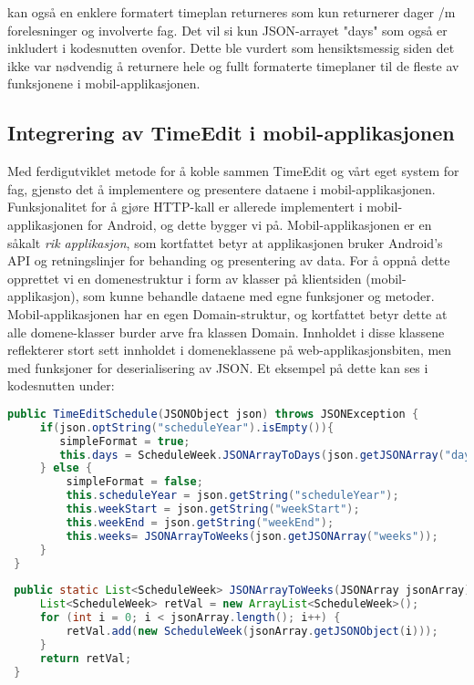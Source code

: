 \documentclass[../main.tex]{subfiles}
\begin{document}
kan også en enklere formatert timeplan returneres som kun returnerer dager /m forelesninger og involverte fag. Det vil si kun JSON-arrayet "days" som også er inkludert i kodesnutten ovenfor. Dette ble vurdert som hensiktsmessig siden det ikke var nødvendig å returnere hele og fullt formaterte timeplaner til de fleste av funksjonene i mobil-applikasjonen.

\subsection{Integrering av TimeEdit i mobil-applikasjonen}

Med ferdigutviklet metode for å koble sammen TimeEdit og vårt eget system for fag, gjensto det å implementere og presentere dataene i mobil-applikasjonen. Funksjonalitet for å gjøre HTTP-kall er allerede implementert i mobil-applikasjonen for Android, og dette bygger vi på. Mobil-applikasjonen er en såkalt \textit{rik applikasjon}, som kortfattet betyr at applikasjonen bruker Android's API og retningslinjer for behanding og presentering av data. For å oppnå dette opprettet vi en domenestruktur i form av klasser på klientsiden (mobil-applikasjon), som kunne behandle dataene med egne funksjoner og metoder. Mobil-applikasjonen har en egen Domain-struktur, og kortfattet betyr dette at alle domene-klasser burder arve fra klassen Domain. Innholdet i disse klassene reflekterer stort sett innholdet i domeneklassene på web-applikasjonsbiten, men med funksjoner for deserialisering av JSON. Et eksempel på dette kan ses i kodesnutten under:
 
\begin{lstlisting}[language=Java, frame=single, caption={To funksjoner fra Domain-klassen TimeEditSchedule i mobil-applikasjonen}]
public TimeEditSchedule(JSONObject json) throws JSONException {
     if(json.optString("scheduleYear").isEmpty()){
        simpleFormat = true;
        this.days = ScheduleWeek.JSONArrayToDays(json.getJSONArray("days"));
     } else {
         simpleFormat = false;
         this.scheduleYear = json.getString("scheduleYear");
         this.weekStart = json.getString("weekStart");
         this.weekEnd = json.getString("weekEnd");
         this.weeks= JSONArrayToWeeks(json.getJSONArray("weeks"));
     }      
 }
     
 public static List<ScheduleWeek> JSONArrayToWeeks(JSONArray jsonArray) throws JSONException {
     List<ScheduleWeek> retVal = new ArrayList<ScheduleWeek>();        
     for (int i = 0; i < jsonArray.length(); i++) {
         retVal.add(new ScheduleWeek(jsonArray.getJSONObject(i)));
     }        
     return retVal;
 }
 \end{lstlisting}
 
\end{document}
